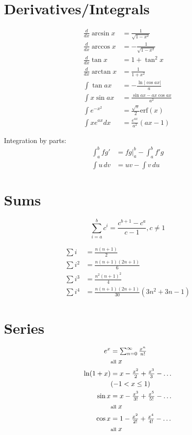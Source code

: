 \section{Derivatives/Integrals}
\begin{align*}
  \tfrac{d}{dx}\arcsin x &= \tfrac{1}{\sqrt{1-x^2}} \\
  \tfrac{d}{dx}\arccos x &= -\tfrac{1}{\sqrt{1-x^2}} \\
  \tfrac{d}{dx}\tan x &= 1+\tan^2 x \\
  \tfrac{d}{dx}\arctan x &= \tfrac{1}{1+x^2} \\
  \int\tan ax &= -\tfrac{\ln|\cos ax|}{a} \\
  \int x\sin ax &= \tfrac{\sin ax-ax \cos ax}{a^2} \\
  \int e^{-x^2} &= \tfrac{\sqrt \pi}{2} \text{erf}(x) \\
  \int xe^{ax}dx &= \tfrac{e^{ax}}{a^2}(ax-1)
\end{align*}

Integration by parts:
\[
\begin{aligned}
  \int_a^b fg' &= fg \big|_a^b - \int_a^b f'g \\
  \int u \, dv &= uv - \int v \, du
\end{aligned}
\]

\section{Sums}
\[ \sum_{i=a}^{b} c^i = \frac{c^{b+1} - c^a}{c-1}, c \neq 1 \]

\begin{align*}
  \textstyle\sum i &= \tfrac{n(n+1)}{2} \\
  \textstyle\sum i^2 &= \tfrac{n(n+1)(2n+1)}{6} \\
  \textstyle\sum i^3 &= \tfrac{n^2(n+1)^2}{4} \\
  \textstyle\sum i^4 &= \tfrac{n(n+1)(2n+1)}{30} (3n^2 + 3n - 1)
\end{align*}

\section{Series}
{\small
\begin{align*}
  e^x &= \textstyle\sum_{n=0}^{\infty} \frac{x^n}{n!} \\
  &\text{\scriptsize all } x \\
  \ln(1+x) &= x - \tfrac{x^2}{2} + \tfrac{x^3}{3} - \dots \\
  &\text{\scriptsize } (-1 < x \le 1) \\
  \sin x &= x - \tfrac{x^3}{3!} + \tfrac{x^5}{5!} - \dots \\
  &\text{\scriptsize all } x \\
  \cos x &= 1 - \tfrac{x^2}{2!} + \tfrac{x^4}{4!} - \dots \\
  &\text{\scriptsize all } x 
\end{align*}
}

